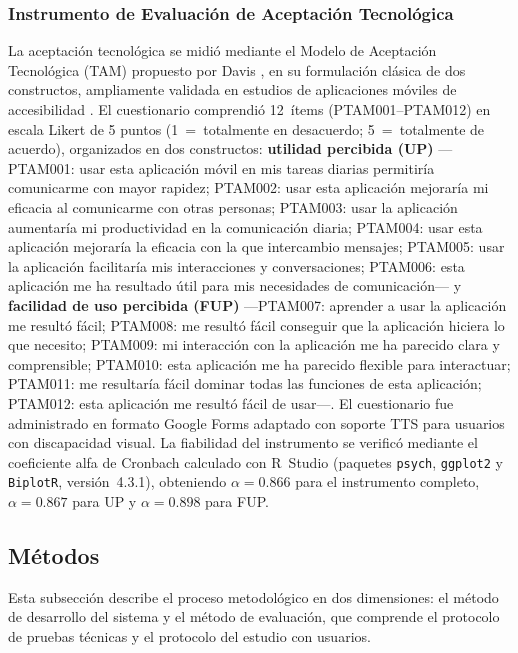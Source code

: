 \documentclass[journal]{IEEEtran}
\begin{document}
	\subsubsection{Instrumento de Evaluaci\'on de Aceptaci\'on Tecnol\'ogica}
	La aceptaci\'on tecnol\'ogica se midi\'o mediante el Modelo de Aceptaci\'on Tecnol\'ogica (TAM) propuesto por Davis \cite{davis1989}, en su formulaci\'on cl\'asica de dos constructos, ampliamente validada en estudios de aplicaciones m\'oviles de accesibilidad \cite{julianto2023}. El cuestionario comprendi\'o 12~\'items (PTAM001--PTAM012) en escala Likert de 5 puntos (1~=~totalmente en desacuerdo; 5~=~totalmente de acuerdo), organizados en dos constructos: \textbf{utilidad percibida (UP)} ---PTAM001: usar esta aplicaci\'on m\'ovil en mis tareas diarias permitir\'ia comunicarme con mayor rapidez; PTAM002: usar esta aplicaci\'on mejorar\'ia mi eficacia al comunicarme con otras personas; PTAM003: usar la aplicaci\'on aumentar\'ia mi productividad en la comunicaci\'on diaria; PTAM004: usar esta aplicaci\'on mejorar\'ia la eficacia con la que intercambio mensajes; PTAM005: usar la aplicaci\'on facilitar\'ia mis interacciones y conversaciones; PTAM006: esta aplicaci\'on me ha resultado \'util para mis necesidades de comunicaci\'on--- y \textbf{facilidad de uso percibida (FUP)} ---PTAM007: aprender a usar la aplicaci\'on me result\'o f\'acil; PTAM008: me result\'o f\'acil conseguir que la aplicaci\'on hiciera lo que necesito; PTAM009: mi interacci\'on con la aplicaci\'on me ha parecido clara y comprensible; PTAM010: esta aplicaci\'on me ha parecido flexible para interactuar; PTAM011: me resultar\'ia f\'acil dominar todas las funciones de esta aplicaci\'on; PTAM012: esta aplicaci\'on me result\'o f\'acil de usar---. El cuestionario fue administrado en formato Google Forms adaptado con soporte TTS para usuarios con discapacidad visual. La fiabilidad del instrumento se verific\'o mediante el coeficiente alfa de Cronbach calculado con R~Studio (paquetes \texttt{psych}, \texttt{ggplot2} y \texttt{BiplotR}, versi\'on~4.3.1), obteniendo $\alpha=0.866$ para el instrumento completo, $\alpha=0.867$ para UP y $\alpha=0.898$ para FUP.
	
	\subsection{M\'etodos}
	Esta subsecci\'on describe el proceso metodol\'ogico en dos dimensiones: el m\'etodo de desarrollo del sistema y el m\'etodo de evaluaci\'on, que comprende el protocolo de pruebas t\'ecnicas y el protocolo del estudio con usuarios.
	
\end{document}
